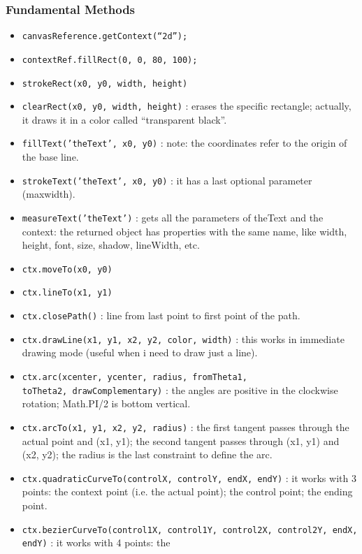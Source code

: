 \documentclass[a4paper,11pt]{book}
\begin{document}
	\subsubsection{Fundamental Methods}
	\begin{itemize}	
	\item \texttt{canvasReference.getContext(``2d'');}
	\item \texttt{contextRef.fillRect(0, 0, 80, 100);}
	\item \texttt{strokeRect(x0, y0, width, height)}
	\item \texttt{clearRect(x0, y0, width, height)} : erases the specific rectangle; actually,
				it draws it in a color called ``transparent black''.
	\item \texttt{fillText('theText', x0, y0)} : note: the coordinates refer to the origin of the base line.
	\item \texttt{strokeText('theText', x0, y0)} : it has a last optional parameter (maxwidth).
	\item \texttt{measureText('theText')} : gets all the parameters of theText and the context: the returned
				object has properties with the same name, like width, height, font, size, shadow, lineWidth, etc.
	\item \texttt{ctx.moveTo(x0, y0)}
	\item \texttt{ctx.lineTo(x1, y1)}
	\item \texttt{ctx.closePath()} : line from last point to first point of the path.
	\item \texttt{ctx.drawLine(x1, y1, x2, y2, color, width)} : this works in immediate drawing mode (useful when i need
			to draw just a line).
	\item \texttt{ctx.arc(xcenter, ycenter, radius, fromTheta1, \\
	toTheta2, drawComplementary)} : the angles are positive
			in the clockwise rotation; Math.PI/2 is bottom vertical.
	\item \texttt{ctx.arcTo(x1, y1, x2, y2, radius)} : the first tangent passes through the actual point and (x1, y1);
			the second tangent passes through (x1, y1) and (x2, y2); the radius is the last constraint to define the arc.
	\item \texttt{ctx.quadraticCurveTo(controlX, controlY, endX, endY)} : it works with 3 points: the context point (i.e.
			the actual point); the control point; the ending point.
	\item \texttt{ctx.bezierCurveTo(control1X, control1Y, control2X, control2Y, endX, endY)} : it works with 4 points: the

\end{itemize}
\end{document}
